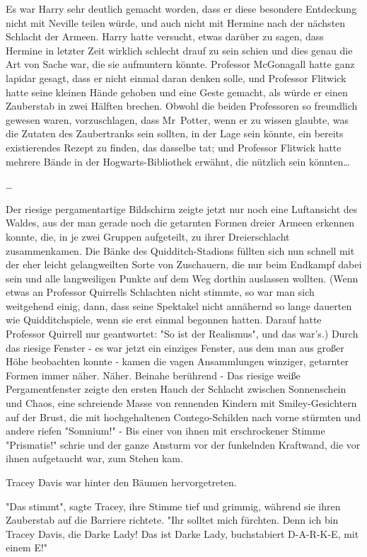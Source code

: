 {Es war Harry sehr deutlich gemacht worden, dass er diese besondere Entdeckung nicht mit Neville teilen würde, und auch nicht mit Hermine nach der nächsten Schlacht der Armeen. Harry hatte versucht, etwas darüber zu sagen, dass Hermine in letzter Zeit wirklich schlecht drauf zu sein schien und dies genau die Art von Sache war, die sie aufmuntern könnte. Professor McGonagall hatte ganz lapidar gesagt, dass er nicht einmal daran denken solle, und Professor Flitwick hatte seine kleinen Hände gehoben und eine Geste gemacht, als würde er einen Zauberstab in zwei Hälften brechen. Obwohl die beiden Professoren so freundlich gewesen waren, vorzuschlagen, dass Mr~Potter, wenn er zu wissen glaubte, was die Zutaten des Zaubertranks sein sollten, in der Lage sein könnte, ein bereits existierendes Rezept zu finden, das dasselbe tat; und Professor Flitwick hatte mehrere Bände in der Hogwarts-Bibliothek erwähnt, die nützlich sein könnten…

…

Der riesige pergamentartige Bildschirm zeigte jetzt nur noch eine Luftansicht des Waldes, aus der man gerade noch die getarnten Formen dreier Armeen erkennen konnte, die, in je zwei Gruppen aufgeteilt, zu ihrer Dreierschlacht zusammenkamen. Die Bänke des Quidditch-Stadions füllten sich nun schnell mit der eher leicht gelangweilten Sorte von Zuschauern, die nur beim Endkampf dabei sein und alle langweiligen Punkte auf dem Weg dorthin auslassen wollten. (Wenn etwas an Professor Quirrells Schlachten nicht stimmte, so war man sich weitgehend einig, dann, dass seine Spektakel nicht annähernd so lange dauerten wie Quidditchspiele, wenn sie erst einmal begonnen hatten. Darauf hatte Professor Quirrell nur geantwortet: "So ist der Realismus", und das war's.) Durch das riesige Fenster - es war jetzt ein einziges Fenster, aus dem man aus großer Höhe beobachten konnte - kamen die vagen Ansammlungen winziger, getarnter Formen immer näher. Näher. Beinahe berührend - Das riesige weiße Pergamentfenster zeigte den ersten Hauch der Schlacht zwischen Sonnenschein und Chaos, eine schreiende Masse von rennenden Kindern mit Smiley-Gesichtern auf der Brust, die mit hochgehaltenen Contego-Schilden nach vorne stürmten und andere riefen "Somnium!" - Bis einer von ihnen mit erschrockener Stimme "Prismatis!" schrie und der ganze Ansturm vor der funkelnden Kraftwand, die vor ihnen aufgetaucht war, zum Stehen kam.

Tracey Davis war hinter den Bäumen hervorgetreten.

"Das stimmt", sagte Tracey, ihre Stimme tief und grimmig, während sie ihren Zauberstab auf die Barriere richtete. "Ihr solltet mich fürchten. Denn ich bin Tracey Davis, die Darke Lady! Das ist Darke Lady, buchstabiert D-A-R-K-E, mit einem E!"

}
